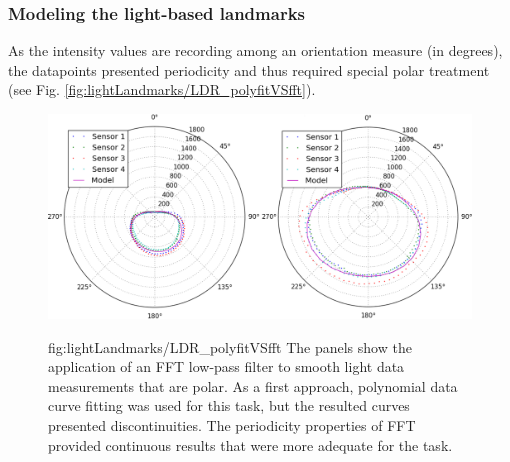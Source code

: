 \subsubsection{Modeling the light-based landmarks}

As the intensity values are recording among an orientation measure (in degrees), the datapoints presented periodicity and thus required special polar treatment (see Fig. \ref{fig:lightLandmarks/LDR_polyfitVSfft}).






\begin{figure}[h!]
\centerline{\mbox{\includegraphics[width=15cm]{images/lightLandmarks/LDR_polyfitVSfft.eps}}}
{fig:lightLandmarks/LDR_polyfitVSfft}{
The panels show the application of an FFT low-pass filter to smooth light data measurements that are polar. As a first approach, polynomial data curve fitting was used for this task, but the resulted curves presented discontinuities. The periodicity properties of FFT provided continuous results that were more adequate for the task.
}\end{figure}







